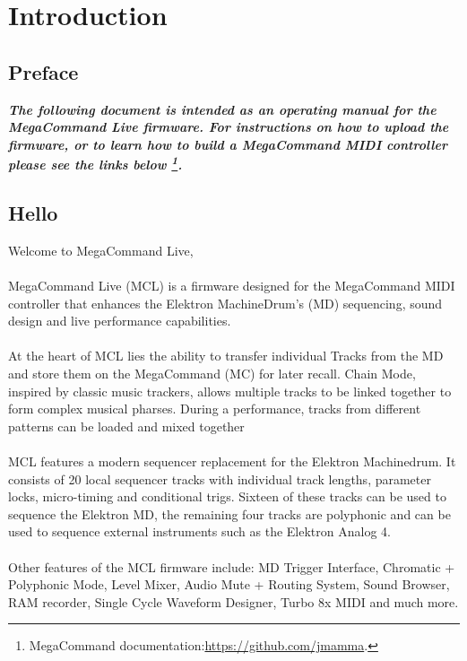 \chapter{Introduction}

\section{Preface}

\begin{small}
\textbf{\textit{The following document is intended as an operating manual for the MegaCommand Live firmware. For instructions on how to upload the firmware, or to learn how to build a MegaCommand MIDI controller please see the links below \footnote{MegaCommand documentation:\url{https://github.com/jmamma}.}.}}
\end{small}

\section{Hello}
Welcome to MegaCommand Live, 
\\
\\
MegaCommand Live (MCL) is a firmware designed for the MegaCommand MIDI controller that enhances the Elektron MachineDrum's (MD) sequencing, sound design and live performance capabilities.
\\
\\
At the heart of MCL lies the ability to transfer individual Tracks from the MD and store them on the MegaCommand (MC) for later recall. Chain Mode, inspired by classic music trackers, allows multiple tracks to be linked together to form complex musical pharses. During a performance, tracks from different patterns can be loaded and mixed together
\\
\\
MCL features a modern sequencer replacement for the Elektron Machinedrum. It consists of 20 local sequencer tracks with individual track lengths, parameter locks, micro-timing and conditional trigs. Sixteen of these tracks can be used to sequence the Elektron MD, the remaining four tracks are polyphonic and can be used to sequence external instruments such as the Elektron Analog 4. 
\\
\\
Other features of the MCL firmware include: MD Trigger Interface, Chromatic + Polyphonic Mode,  Level Mixer, Audio Mute + Routing System, Sound Browser, RAM recorder, Single Cycle Waveform Designer, Turbo 8x MIDI and much more.
